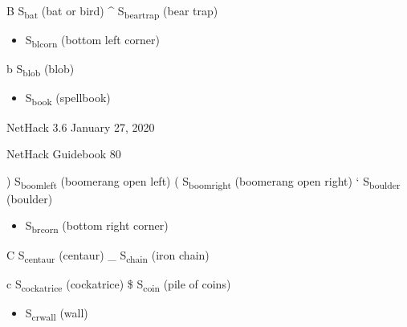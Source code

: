 \documentclass[11pt]{article}
\begin{document}
B S\textsubscript{bat}         (bat or bird)
\^{} S\textsubscript{bear}\textsubscript{trap}      (bear trap)
\begin{itemize}
\item S\textsubscript{blcorn}        (bottom left corner)
\end{itemize}
b S\textsubscript{blob}         (blob)
\begin{itemize}
\item S\textsubscript{book}         (spellbook)
\end{itemize}



NetHack 3.6                   January 27, 2020





NetHack Guidebook                       80



) S\textsubscript{boomleft}       (boomerang open left)
( S\textsubscript{boomright}      (boomerang open right)
` S\textsubscript{boulder}       (boulder)
\begin{itemize}
\item S\textsubscript{brcorn}        (bottom right corner)
\end{itemize}
C S\textsubscript{centaur}       (centaur)
\_ S\textsubscript{chain}        (iron chain)

c S\textsubscript{cockatrice}      (cockatrice)
\$ S\textsubscript{coin}         (pile of coins)

\begin{itemize}
\item S\textsubscript{crwall}        (wall)
\end{itemize}
\end{document}
